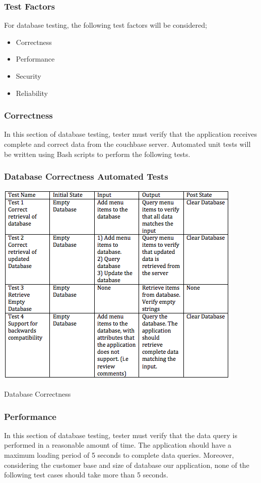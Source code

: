 \documentclass[12pt]{article}
\begin{document}
\subsubsection{Test Factors}
For database testing, the following test factors will be considered;
\begin{itemize}
 \item Correctness
 \item Performance
 \item Security
 \item Reliability
 \end{itemize}
 
\subsubsection{Correctness}
In this section of database testing, tester must verify that the application receives complete and correct data from the couchbase server. Automated unit tests will be written using Bash scripts to perform the following tests.
\subsubsection{Database Correctness Automated Tests }
\break
\begin{table}[h]
\includegraphics[width=\textwidth,height=\textheight,keepaspectratio]{correctness_tests.png}
  \caption{Database Correctness}
  \label{tbl:excel-table}
\end{table}
\subsubsection{Performance}
In this section of database testing, tester must verify that the data query is performed in a reasonable amount of time. The application should have a maximum loading period of 5 seconds to complete data queries. Moreover, considering the customer base and size of database our application, none of the following test cases should take more than 5 seconds.
\end{document}
